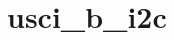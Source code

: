 \hypertarget{group__usci__b__i2c__api}{}\section{usci\+\_\+b\+\_\+i2c}
\label{group__usci__b__i2c__api}
